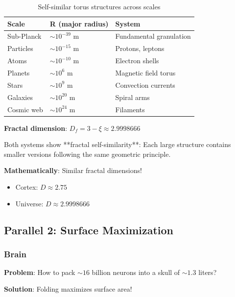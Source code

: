 	\begin{table}[H]
		\centering
		\small
		\begin{tabular}{lll}
			\toprule
			\textbf{Scale} & \textbf{R (major radius)} & \textbf{System} \\
			\midrule
			Sub-Planck & $\sim 10^{-39}$ m & Fundamental granulation \\
			Particles & $\sim 10^{-15}$ m & Protons, leptons \\
			Atoms & $\sim 10^{-10}$ m & Electron shells \\
			Planets & $\sim 10^{6}$ m & Magnetic field torus \\
			Stars & $\sim 10^{9}$ m & Convection currents \\
			Galaxies & $\sim 10^{20}$ m & Spiral arms \\
			Cosmic web & $\sim 10^{24}$ m & Filaments \\
			\bottomrule
		\end{tabular}
		\caption{Self-similar torus structures across scales}
	\end{table}
	
	\textbf{Fractal dimension}: $D_f = 3 - \xi \approx 2.9998666$
	
	\begin{keyresult}
		Both systems show **fractal self-similarity**: Each large structure contains smaller versions following the same geometric principle.
		
		\textbf{Mathematically}: Similar fractal dimensions!
		\begin{itemize}
			\item Cortex: $D \approx 2.75$
			\item Universe: $D \approx 2.9998666$
		\end{itemize}
	\end{keyresult}
	
	\subsection{Parallel 2: Surface Maximization}
	
	\subsubsection{Brain}
	
	\textbf{Problem}: How to pack $\sim 16$ billion neurons into a skull of $\sim 1.3$ liters?
	
	\textbf{Solution}: Folding maximizes surface area!
	
